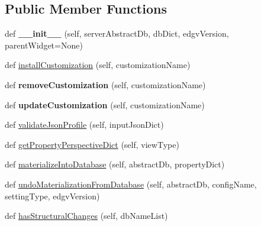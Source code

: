 \subsection*{Public Member Functions}
\begin{DoxyCompactItemize}
\item 
\mbox{\label{class_dsg_tools_1_1_server_management_tools_1_1customization_manager_1_1_customization_manager_a869e5eb38e2d838640c119e438def47a}} 
def {\bfseries \+\_\+\+\_\+init\+\_\+\+\_\+} (self, server\+Abstract\+Db, db\+Dict, edgv\+Version, parent\+Widget=None)
\item 
def \mbox{\hyperlink{class_dsg_tools_1_1_server_management_tools_1_1customization_manager_1_1_customization_manager_ae26c4f98ac0a48bd089d4bab38f8fbcc}{install\+Customization}} (self, customization\+Name)
\item 
\mbox{\label{class_dsg_tools_1_1_server_management_tools_1_1customization_manager_1_1_customization_manager_ace58e79793e975d5ceeff21007feac7f}} 
def {\bfseries remove\+Customization} (self, customization\+Name)
\item 
\mbox{\label{class_dsg_tools_1_1_server_management_tools_1_1customization_manager_1_1_customization_manager_ac82233a50914cd1adf2194c1d5408ffc}} 
def {\bfseries update\+Customization} (self, customization\+Name)
\item 
def \mbox{\hyperlink{class_dsg_tools_1_1_server_management_tools_1_1customization_manager_1_1_customization_manager_ac70eb9c7eb2d708ed0cdbd17c83f4b6d}{validate\+Json\+Profile}} (self, input\+Json\+Dict)
\item 
def \mbox{\hyperlink{class_dsg_tools_1_1_server_management_tools_1_1customization_manager_1_1_customization_manager_a1d2a8164b801ff030d65cb8e02786e9c}{get\+Property\+Perspective\+Dict}} (self, view\+Type)
\item 
def \mbox{\hyperlink{class_dsg_tools_1_1_server_management_tools_1_1customization_manager_1_1_customization_manager_a6d267613675bed63c0e45cba18f277c1}{materialize\+Into\+Database}} (self, abstract\+Db, property\+Dict)
\item 
def \mbox{\hyperlink{class_dsg_tools_1_1_server_management_tools_1_1customization_manager_1_1_customization_manager_a108ee02a6c33d1fd38f72eb3c9a4780f}{undo\+Materialization\+From\+Database}} (self, abstract\+Db, config\+Name, setting\+Type, edgv\+Version)
\item 
def \mbox{\hyperlink{class_dsg_tools_1_1_server_management_tools_1_1customization_manager_1_1_customization_manager_ab5dbdbb7abfe5e2eaed06871aac12ca4}{has\+Structural\+Changes}} (self, db\+Name\+List)
\end{DoxyCompactItemize}
